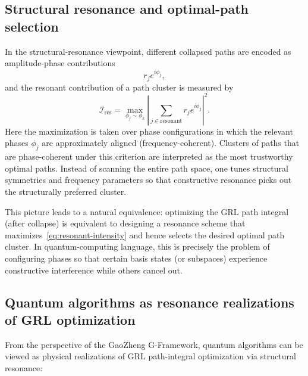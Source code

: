 \documentclass[11pt]{book}
\theoremstyle{plain}
\theoremstyle{definition}
\theoremstyle{remark}
\begin{document}
\subsection{Structural resonance and optimal-path selection}

In the structural-resonance viewpoint, different collapsed paths are
encoded as amplitude-phase contributions
\[
  r_j e^{i\phi_j},
\]
and the resonant contribution of a path cluster is measured by
\begin{equation}
  \mathcal{I}_{\mathrm{res}}
  =
  \max_{\phi_j \sim \phi_k}
  \left|
    \sum_{j\in\mathrm{resonant}}
      r_j e^{i\phi_j}
  \right|^2.
  \label{eq:resonant-intensity}
\end{equation}
Here the maximization is taken over phase configurations in which the
relevant phases $\phi_j$ are approximately aligned (frequency-coherent).
Clusters of paths that are phase-coherent under this criterion are
interpreted as the most trustworthy optimal paths. Instead of scanning
the entire path space, one tunes structural symmetries and frequency
parameters so that constructive resonance picks out the structurally
preferred cluster.

This picture leads to a natural equivalence: optimizing the GRL
path integral (after collapse) is equivalent to designing a resonance
scheme that maximizes~\eqref{eq:resonant-intensity} and hence selects the
desired optimal path cluster. In quantum-computing language, this is
precisely the problem of configuring phases so that certain basis states
(or subspaces) experience constructive interference while others cancel
out.

\subsection{Quantum algorithms as resonance realizations of GRL optimization}

From the perspective of the GaoZheng G-Framework, quantum algorithms can
be viewed as physical realizations of GRL path-integral optimization via
structural resonance:
\end{document}
